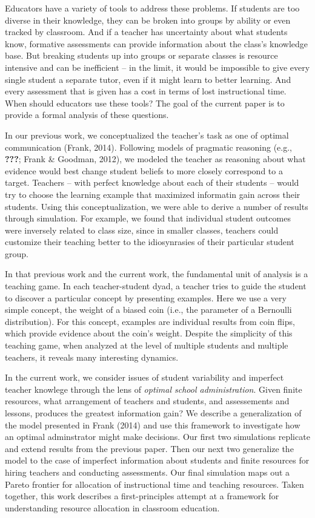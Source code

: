 \documentclass[10pt, letterpaper]{article}
\begin{document}
Educators have a variety of tools to address these problems. If students
are too diverse in their knowledge, they can be broken into groups by
ability or even tracked by classroom. And if a teacher has uncertainty
about what students know, formative assessments can provide information
about the class's knowledge base. But breaking students up into groups
or separate classes is resource intensive and can be inefficient -- in
the limit, it would be impossible to give every single student a
separate tutor, even if it might learn to better learning. And every
assessment that is given has a cost in terms of lost instructional time.
When should educators use these tools? The goal of the current paper is
to provide a formal analysis of these questions.

In our previous work, we conceptualized the teacher's task as one of
optimal communication (Frank, 2014). Following models of pragmatic
reasoning (e.g., {\textbf{???}}; Frank \& Goodman, 2012), we modeled the
teacher as reasoning about what evidence would best change student
beliefs to more closely correspond to a target. Teachers -- with perfect
knowledge about each of their students -- would try to choose the
learning example that maximized informatin gain across their students.
Using this conceptualization, we were able to derive a number of results
through simulation. For example, we found that individual student
outcomes were inversely related to class size, since in smaller classes,
teachers could customize their teaching better to the idiosynrasies of
their particular student group.

In that previous work and the current work, the fundamental unit of
analysis is a teaching game. In each teacher-student dyad, a teacher
tries to guide the student to discover a particular concept by
presenting examples. Here we use a very simple concept, the weight of a
biased coin (i.e., the parameter of a Bernoulli distribution). For this
concept, examples are individual results from coin flips, which provide
evidence about the coin's weight. Despite the simplicity of this
teaching game, when analyzed at the level of multiple students and
multiple teachers, it reveals many interesting dynamics.

In the current work, we consider issues of student variability and
imperfect teacher knowlege through the lens of \emph{optimal school
administration}. Given finite resources, what arrangement of teachers
and students, and assessements and lessons, produces the greatest
information gain? We describe a generalization of the model presented in
Frank (2014) and use this framework to investigate how an optimal
adminstrator might make decisions. Our first two simulations replicate
and extend results from the previous paper. Then our next two generalize
the model to the case of imperfect information about students and finite
resources for hiring teachers and conducting assessments. Our final
simulation maps out a Pareto frontier for allocation of instructional
time and teaching resources. Taken together, this work describes a
first-principles attempt at a framework for understanding resource
allocation in classroom education.
\end{document}
